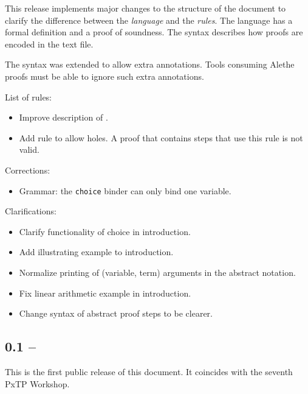 This release implements major changes to the structure of the document to
clarify the difference between the \emph{language} and the \emph{rules}.
The language has a formal definition and a proof of soundness.  The syntax
describes how proofs are encoded in the text file.

The syntax was extended to allow extra annotations.  Tools consuming Alethe
proofs must be able to ignore such extra annotations.

List of rules:
\begin{itemize}
    \item Improve description of .
    \item Add {} rule to allow holes.  A proof that contains
    steps that use this rule is not valid.
\end{itemize}
\noindent
Corrections:
\begin{itemize}
    \item Grammar: the \texttt{choice} binder can only bind one variable.
\end{itemize}

\noindent
Clarifications:
\begin{itemize}
    \item Clarify functionality of choice in introduction.
    \item Add illustrating example to introduction.
    \item Normalize printing of (variable, term) arguments in the abstract notation.
    \item Fix linear arithmetic example in introduction.
    \item Change syntax of abstract proof steps to be clearer.
\end{itemize}


\subsection*{0.1 -- }

This is the first public release of this document.  It coincides with
the seventh PxTP Workshop.
